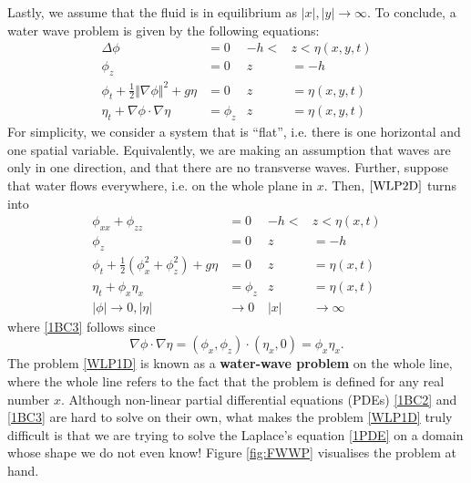 \documentclass[10pt,reqno,oneside,a4paper]{article}
\begin{document}
Lastly, we assume that the fluid is in equilibrium as $|x|, |y| \to \infty.$ To conclude, a water wave problem is given by the following equations:
\begin{subequations}\label{WLP2D}
\begin{align}
\label{2PDE} \Delta \phi &= 0  &-h <&z < \eta(x,y,t) \\
\label{2BC1} \phi_z &= 0 &z &= -h  \\ 
\label{2BC2} \phi_t + \frac{1}{2} \Vert \nabla \phi \Vert^2 + g \eta &= 0 &z &= \eta(x,y,t)\\
\label{2BC3} \eta_t + \nabla \phi \cdot \nabla \eta &= \phi_z &z &= \eta(x,y,t)
\end{align}
\end{subequations}
For simplicity, we consider a system that is ``flat'', i.e. there is one horizontal and one spatial variable. Equivalently, we are making an assumption that waves are only in one direction, and that there are no transverse waves. Further, suppose that water flows everywhere, i.e. on the whole plane in $x$. Then, $\eqref{WLP2D}$ turns into 
\begin{subequations}\label{WLP1D}
\begin{align}
\label{1PDE} \phi_{xx} + \phi_{zz} &= 0  &-h <&z < \eta(x,t) \\
\label{1BC1} \phi_z &= 0 &z &= -h  \\ 
\label{1BC2} \phi_t + \frac{1}{2} (\phi_{x}^2 + \phi_{z}^2) + g \eta &= 0 &z &= \eta(x,t)\\
\label{1BC3} \eta_t + \phi_x\eta_x &=\phi_z &z &= \eta(x,t) \\
\label{1BC4} |\phi| \to 0, |\eta| &\to 0  &|x| &\to \infty
\end{align}
\end{subequations}
where \eqref{1BC3} follows since 
\[\nabla \phi \cdot \nabla \eta = (\phi_x, \phi_z) \cdot (\eta_x, 0) = \phi_x\eta_x.\]
The problem \eqref{WLP1D} is known as a \textbf{water-wave problem} on the whole line, where the whole line refers to the fact that the problem is defined for any real number $x$. Although non-linear partial differential equations (PDEs) \eqref{1BC2} and \eqref{1BC3} are hard to solve on their own, what makes the problem \eqref{WLP1D} truly difficult is that we are trying to solve the Laplace's equation \eqref{1PDE} on a domain whose shape we do not even know! Figure \ref{fig:FWWP} visualises the problem at hand.
\end{document}
